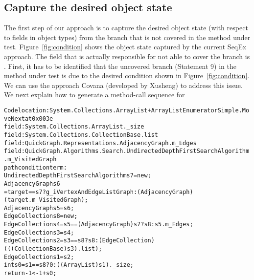 \subsection{Capture the desired object state}

The first step of our approach is to capture the desired object state (with respect to fields in object types) from the branch that is not covered in the method under test. Figure~\ref{fig:condition} shows the object state captured by the current SeqEx approach. The field that is actually responsible for not able to cover the branch is . First, it has to be identified that the uncovered branch (Statement 9) in the method under test is due to the desired condition shown in Figure~\ref{fig:condition}. We can use the approach Covana (developed by Xusheng) to address this issue. We next explain how to generate a method-call sequence for 

\begin{figure*}[t]
\begin{CodeOut}
\begin{alltt}
Code location: System.Collections.ArrayList+ArrayListEnumeratorSimple.MoveNext at 0x003e
field: System.Collections.ArrayList._size
field: System.Collections.CollectionBase.list
field: QuickGraph.Representations.AdjacencyGraph.m_Edges
field: QuickGraph.Algorithms.Search.UndirectedDepthFirstSearchAlgorithm.m_VisitedGraph
path condition term: 
UndirectedDepthFirstSearchAlgorithm s7 = new;
AdjacencyGraph s6
   = target == s7 ? g_iVertexAndEdgeListGraph : (AdjacencyGraph)(target.m_VisitedGraph);
AdjacencyGraph s5 = s6;
EdgeCollection s8 = new;
EdgeCollection s4 = s5 == (AdjacencyGraph)s7 ? s8 : s5.m_Edges;
EdgeCollection s3 = s4;
EdgeCollection s2 = s3 == s8 ? s8 : (EdgeCollection)(((CollectionBase)s3).list);
EdgeCollection s1 = s2;
int s0 = s1 == s8 ? 0 : ((ArrayList)s1)._size;
return -1 < -1 + s0;
\end{alltt}
\end{CodeOut}
\end{figure*}



